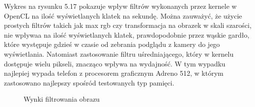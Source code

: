 Wykres na rysunku 5.17 pokazuje wpływ filtrów wykonanych przez kernele w OpenCL na ilość wyświetlanych klatek na sekundę. Można zauważyć, że użycie prostych filtrów takich jak max rgb czy transformacja na obrazek w skali szarości, nie wpływaa na ilość wyświetlanych klatek, prawdopodobnie przez wąskie gardło, które występuje gdzieś w czasie od zebrania podglądu z kamery do jego wyświetlania. Natomiast zastosowanie filtru uśredniającego, który w kernelu dostępuje wielu pikseli, znacząco wpływa na wydajność. W tym wypadku najlepiej wypada telefon z procesorem graficznym Adreno 512, w którym zastosowano najlepszy spośród testowanych typ pamięci.

\begin{figure}[H]
\caption{Wynki filtrowania obrazu}
\end{figure}
